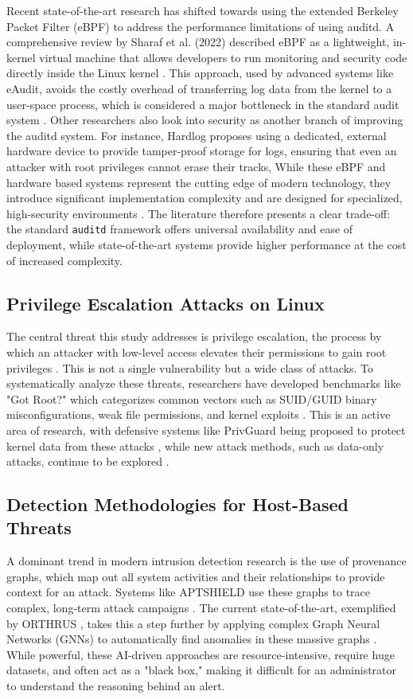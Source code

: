 \documentclass[journal]{./IEEEtran}
\begin{document}
Recent state-of-the-art research has shifted towards using the extended Berkeley Packet Filter (eBPF) to address the performance limitations of using auditd. A comprehensive review by Sharaf et al. (2022) described eBPF as a lightweight, in-kernel virtual machine that allows developers to run monitoring and security code directly inside the Linux kernel \cite{sharaf2022}. This approach, used by advanced systems like eAudit, avoids the costly overhead of transferring log data from the kernel to a user-space process, which is considered a major bottleneck in the standard audit system \cite{sekar2024}. Other researchers also look into security as another branch of improving the auditd system. For instance, Hardlog proposes using a dedicated, external hardware device to provide tamper-proof storage for logs, ensuring that even an attacker with root privileges cannot erase their tracks, While these eBPF and hardware based systems represent the cutting edge of modern technology, they introduce significant implementation complexity and are designed for specialized, high-security environments \cite{ahmad2022, zhang2024}. The literature therefore presents a clear trade-off: the standard \texttt{auditd} framework offers universal availability and ease of deployment, while state-of-the-art systems provide higher performance at the cost of increased complexity.

\subsection{Privilege Escalation Attacks on Linux} 
The central threat this study addresses is privilege escalation, the process by which an attacker with low-level access elevates their permissions to gain root privileges \cite{happe2024}. This is not a single vulnerability but a wide class of attacks. To systematically analyze these threats, researchers have developed benchmarks like "Got Root?" which categorizes common vectors such as SUID/GUID binary misconfigurations, weak file permissions, and kernel exploits \cite{happe2024}. This is an active area of research, with defensive systems like PrivGuard being proposed to protect kernel data from these attacks \cite{qiang2018}, while new attack methods, such as data-only attacks, continue to be explored \cite{zhou2024}.

\subsection{Detection Methodologies for Host-Based Threats}
A dominant trend in modern intrusion detection research is the use of provenance graphs, which map out all system activities and their relationships to provide context for an attack. Systems like APTSHIELD use these graphs to trace complex, long-term attack campaigns \cite{zhu2021}. The current state-of-the-art, exemplified by ORTHRUS , takes this a step further by applying complex Graph Neural Networks (GNNs) to automatically find anomalies in these massive graphs \cite{jiang2024}. While powerful, these AI-driven approaches are resource-intensive, require huge datasets, and often act as a "black box," making it difficult for an administrator to understand the reasoning behind an alert.
\end{document}
